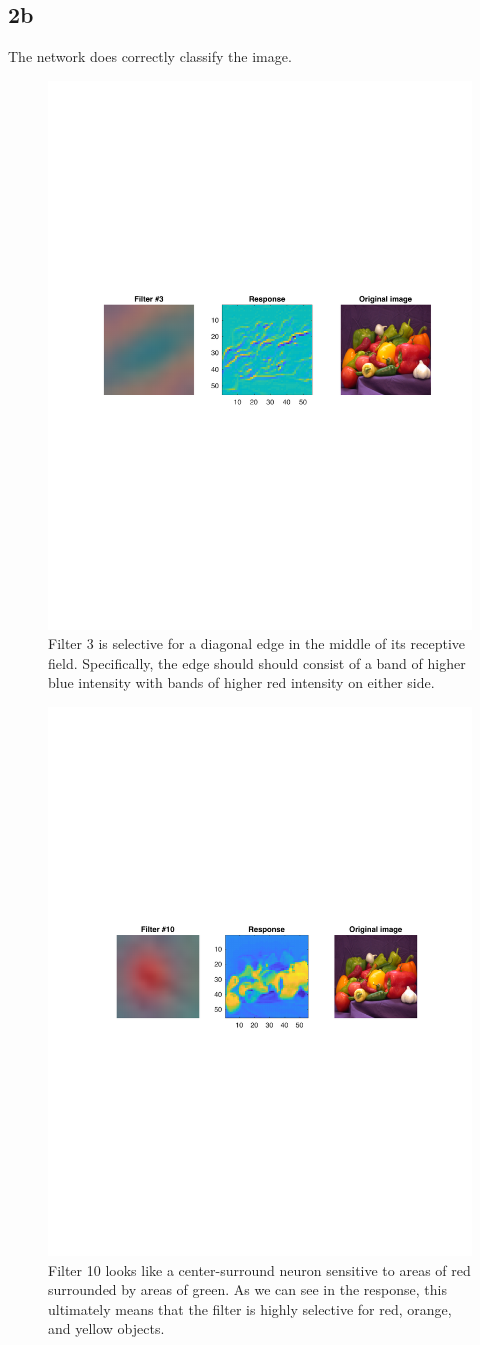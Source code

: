 \documentclass[]{article}
\begin{document}
\subsection*{2b}
The network does correctly classify the image.
\begin{figure}[H]
    \centering
    \includegraphics[width=0.7\linewidth]{problem2Bfilter3.pdf}
    \caption{Filter 3 is selective for a diagonal edge in the middle of its receptive field. Specifically, the edge should should consist of a band of higher blue intensity with bands of higher red intensity on either side.}
    \label{fig:my_label}
\end{figure}
\begin{figure}[H]
    \centering
    \includegraphics[width=0.7\linewidth]{problem2Bfilter10.pdf}
    \caption{Filter 10 looks like a center-surround neuron sensitive to areas of red surrounded by areas of green. As we can see in the response, this ultimately means that the filter is highly selective for red, orange, and yellow objects.}
    \label{fig:my_label}
\end{figure}
\end{document}
